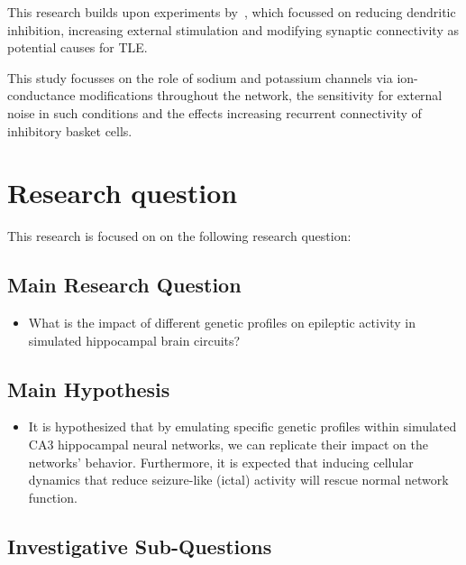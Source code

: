 This research builds upon experiments by~\textcite{sanjayImpairedDendriticInhibition2015},
which focussed on reducing dendritic inhibition, increasing external stimulation and modifying synaptic connectivity as potential causes for TLE\@.

This study focusses on the role of sodium and potassium channels via ion-conductance modifications throughout the network,
the sensitivity for external noise in such conditions and the effects increasing recurrent connectivity of inhibitory basket cells.
\pagebreak
\section{Research question}
This research is focused on on the following research question:

\subsection*{Main Research Question}

\begin{itemize}
    \item What is the impact of different genetic profiles on epileptic activity in simulated hippocampal brain circuits?
\end{itemize}

\subsection*{Main Hypothesis}

\begin{itemize}
    \item It is hypothesized that by emulating specific genetic profiles within simulated CA3 hippocampal neural networks,
          we can replicate their impact on the networks' behavior. Furthermore, it is expected that inducing cellular dynamics that
          reduce seizure-like (ictal) activity will rescue normal network function.
\end{itemize}

\subsection*{Investigative Sub-Questions}

